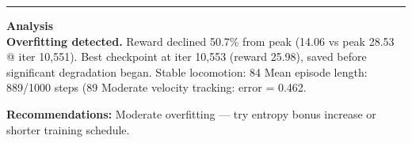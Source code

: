 \documentclass[a4paper,10pt]{article}
\begin{document}
\vspace{2pt}
\hrule
\vspace{2pt}

\footnotesize
\textbf{Analysis} \\[1pt]
\textbf{Overfitting detected.} Reward declined 50.7\% from peak (14.06 vs peak 28.53 @ iter 10,551).
Best checkpoint at iter 10,553 (reward 25.98), saved before significant degradation began.
Stable locomotion: 84%
Mean episode length: 889/1000 steps (89%
Moderate velocity tracking: error = 0.462.

\textbf{Recommendations:}
Moderate overfitting --- try entropy bonus increase or shorter training schedule.
\end{document}
